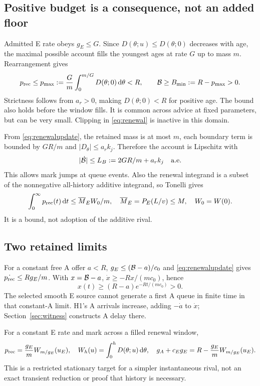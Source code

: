 \subsection{Positive budget is a consequence, not an added floor}
Admitted E rate obeys $g_E\leq G$. Since $D(\theta;u)\leq D(\theta;0)$
decreases with age, the maximal possible account fills the youngest ages
at rate $G$ up to mass $m$. Rearrangement gives
\begin{equation}
 p_{\mathrm{rec}}\leq p_{\max}:=\frac Gm\int_0^{m/G}D(\theta;0)\,\mathrm d\theta<R,
 \qquad\mathcal B\geq B_{\min}:=R-p_{\max}>0. \label{eq:budgetfloor}
\end{equation}
Strictness follows from $a_r>0$, making $D(\theta;0)<R$ for positive
age. The bound also holds before the window fills. It is common across
advice at fixed parameters, but can be very small. Clipping in
\eqref{eq:renewal} is inactive in this domain.

From \eqref{eq:renewalupdate}, the retained mass is at most $m$, each
boundary term is bounded by $GR/m$ and $|D_\theta|\leq a_rk_j$.
Therefore the account is Lipschitz with
\begin{equation}
 |\dot{\mathcal B}|\leq L_B:=2GR/m+a_rk_j\quad\hbox{a.e.}
 \label{eq:budgetrate}
\end{equation}
This allows mark jumps at queue events. Also the renewal integrand is a
subset of the nonnegative all-history additive integrand, so Tonelli gives
\begin{equation}
 \int_0^\infty p_{\mathrm{rec}}(t)\,\mathrm d t\leq
 \overline M_E W_0/m,\quad
 \overline M_E=P_E(L/v)\leq M,\quad W_0=W(0).
 \label{eq:integratedloss}
\end{equation}
It is a bound, not adoption of the additive rival.

\subsection{Two retained limits}
For a constant free A offer $a<R$, $g_E\leq(\mathcal B-a)/c_0$ and
\eqref{eq:renewalupdate} gives $\dot{p_{\mathrm{rec}}}\leq Rg_E/m$. With
$x=\mathcal B-a$, $\dot x\geq-Rx/(mc_0)$, hence
\begin{equation}
 x(t)\geq(R-a)e^{-Rt/(mc_0)}>0. \label{eq:constantA}
\end{equation}
The selected smooth E source cannot generate a first A queue in finite
time in that constant-A limit. H1's A arrivals increase, adding
$-\dot a$ to $\dot x$; Section~\ref{sec:witness} constructs A delay there.

For a constant E rate and mark across a filled renewal window,
\begin{equation}
 p_{\mathrm{rec}}=\frac{g_E}{m}W_{m/g_E}(u_E),\quad
 W_h(u)=\int_0^hD(\theta;u)\,\mathrm d\theta,\quad
 g_A+c_Eg_E=R-\frac{g_E}{m}W_{m/g_E}(u_E). \label{eq:stationaryrenewal}
\end{equation}
This is a restricted stationary target for a simpler instantaneous rival,
not an exact transient reduction or proof that history is necessary.

